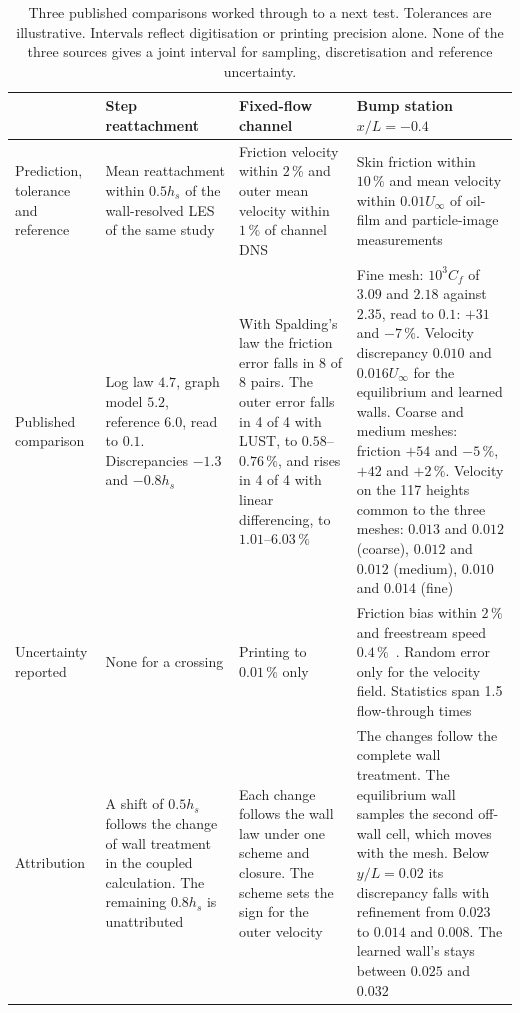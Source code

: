 \begin{table}[t]
\caption{Three published comparisons worked through to a next test. Tolerances are illustrative. Intervals reflect digitisation or printing precision alone. None of the three sources gives a joint interval for sampling, discretisation and reference uncertainty.}\label{tab:decisions}
\footnotesize
\begin{tabular*}{\textwidth}{@{\extracolsep{\fill}}>{\raggedright\arraybackslash}p{}>{\raggedright\arraybackslash}p{}>{\raggedright\arraybackslash}p{}>{\raggedright\arraybackslash}p{}@{}}
\toprule
 & Step reattachment~\cite{Dupuy2023graph} & Fixed-flow channel~\cite{Rezaeiravesh2019} & Bump station $x/L=-0.4$~\cite{DiZhou2024} \\
\midrule
Prediction, tolerance and reference & Mean reattachment within $0.5h_s$ of the wall-resolved LES of the same study & Friction velocity within $2\,\%$ and outer mean velocity within $1\,\%$ of channel DNS & Skin friction within $10\,\%$ and mean velocity within $0.01U_\infty$ of oil-film and particle-image measurements \\
Published comparison & Log law $4.7$, graph model $5.2$, reference $6.0$, read to $0.1$. Discrepancies $-1.3$ and $-0.8h_s$ & With Spalding's law the friction error falls in 8 of 8 pairs. The outer error falls in 4 of 4 with LUST, to $0.58$--$0.76\,\%$, and rises in 4 of 4 with linear differencing, to $1.01$--$6.03\,\%$ & Fine mesh: $10^3C_f$ of $3.09$ and $2.18$ against $2.35$, read to $0.1$: $+31$ and $-7\,\%$. Velocity discrepancy $0.010$ and $0.016U_\infty$ for the equilibrium and learned walls. Coarse and medium meshes: friction $+54$ and $-5\,\%$, $+42$ and $+2\,\%$. Velocity on the 117 heights common to the three meshes: $0.013$ and $0.012$ (coarse), $0.012$ and $0.012$ (medium), $0.010$ and $0.014$ (fine) \\
Uncertainty reported & None for a crossing & Printing to $0.01\,\%$ only & Friction bias within $2\,\%$ and freestream speed $0.4\,\%$~\cite{Gray2023}. Random error only for the velocity field. Statistics span 1.5 flow-through times \\
Attribution & A shift of $0.5h_s$ follows the change of wall treatment in the coupled calculation. The remaining $0.8h_s$ is unattributed & Each change follows the wall law under one scheme and closure. The scheme sets the sign for the outer velocity & The changes follow the complete wall treatment. The equilibrium wall samples the second off-wall cell, which moves with the mesh. Below $y/L=0.02$ its discrepancy falls with refinement from $0.023$ to $0.014$ and $0.008$. The learned wall's stays between $0.025$ and $0.032$ \\

\end{tabular*}
\end{table}
